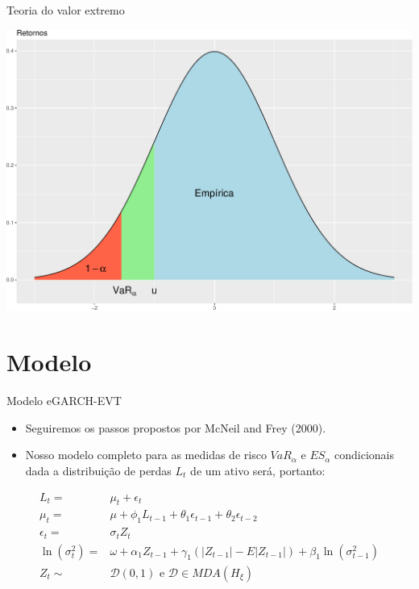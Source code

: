 \documentclass[ignorenonframetext,]{beamer}
\providecommand{\tightlist}{%
  \setlength{\itemsep}{0pt}\setlength{\parskip}{0pt}}
\begin{document}
\begin{frame}{Teoria do valor extremo}

\includegraphics{artigo-apresentacao_files/figure-beamer/pot-1.pdf}

\end{frame}

\section{Modelo}\label{modelo}

\begin{frame}{Modelo eGARCH-EVT}

\begin{itemize}
\tightlist
\item
  Seguiremos os passos propostos por McNeil and Frey (2000).
\item
  Nosso modelo completo para as medidas de risco \(VaR_\alpha\) e
  \(ES_\alpha\) condicionais dada a distribuição de perdas \(L_t\) de um
  ativo será, portanto:
\end{itemize}

\begin{align}
L_t=&\mu_t+\epsilon_t \\
\mu_t=&\mu+ \phi_1 L_{t-1}+ \theta_1\epsilon_{t-1}+ \theta_2\epsilon_{t-2} \label{eq:mut} \\
\epsilon_t=&\sigma_t Z_t\\
\ln(\sigma_t^2)=&\omega+ \alpha_1 Z_{t-1}+ \gamma_1(|Z_{t-1}|-E|Z_{t-1}|)+ \beta_1 \ln(\sigma_{t-1}^2) \label{eq:sigma2} \\
Z_t\sim &\mathcal{D}(0,1) \text{ e } \mathcal{D} \in MDA(H_\xi)
\end{align}

\end{frame}
\end{document}
